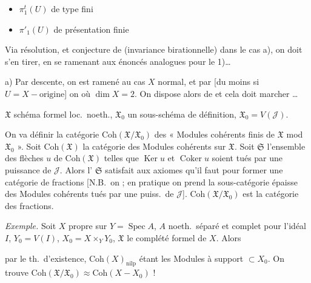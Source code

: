 \documentclass[11pt,a4paper]{article}
\begin{document}
\begin{itemize}
\item[a)] $\pi^t_1(U)$ de type fini
\item[b)] $\pi'_1(U)$ de présentation finie
\end{itemize}

Via résolution, et conjecture de  (invariance
birationnelle) dans le cas a), on doit s'en tirer, en se ramenant aux énoncés
analogues pour le 1)\ldots


a) Par descente, on est ramené au cas $X$ normal, et par
 [du moins si $U = X - \text{origine}$] on \ill{} où
$\dim X = 2$. On dispose alors de  et cela doit
marcher \ldots


$\mathfrak{X}$ schéma formel loc.\ noeth., $\mathfrak{X}_0$ un
sous-schéma de définition, $\mathfrak{X}_0 = V(\mathcal{J})$.

On va définir la catégorie $\mathrm{Coh}(\mathfrak{X}/\mathfrak{X}_0)$ des
« Modules cohérents finis de $\mathfrak{X}$ mod $\mathfrak{X}_0$ ». Soit
$\mathrm{Coh}(\mathfrak{X})$ la catégorie des 
Modules cohérents sur $\mathfrak{X}$.  Soit $\mathfrak{S}$
l'ensemble des flèches $u$ de $\mathrm{Coh}(\mathfrak{X})$ telles que
$\operatorname{Ker} u$ et $\operatorname{Coker} u$ soient \struck{\ill{}}
\ill{} tués par une puissance de $\mathcal{J}$. Alors l'
$\mathfrak{S}$ satisfait aux axiomes qu'il faut pour former une catégorie de
fractions [N.B.\ on \ill{} ; en pratique on prend la sous-catégorie épaisse
des Modules cohérents tués par une puiss.\ de $\mathcal{J}$].
$\mathrm{Coh}(\mathfrak{X}/\mathfrak{X}_0)$ est la catégorie des fractions.

\emph{Exemple.} Soit $X$ propre sur $Y = \operatorname{Spec} A$, $A$ noeth.\
séparé et complet pour l'idéal $I$, $Y_0 = V(I)$, $X_0 = X \times_Y Y_0$,
$\mathfrak{X}$ le complété formel de $X$. Alors


par le th.\ d'existence, $\mathrm{Coh}(X)_{\mathrm{nilp}}$ étant les Modules à
support $\subset X_0$. On trouve
$\mathrm{Coh}(\mathfrak{X}/\mathfrak{X}_0) \approx \mathrm{Coh}(X - X_0)$ !
\end{document}
